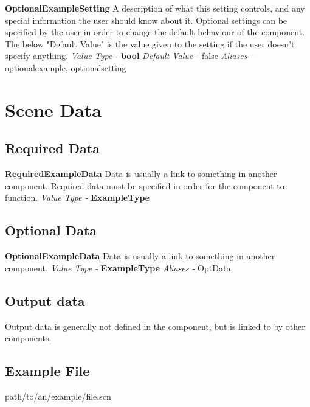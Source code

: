 \documentclass[a4paper,11pt]{article}
\newenvironment{componentoption}[1]%
{\textbf{#1}\newline}
{\newline}
\newcommand{\aliases}[1] {\newline \textit{Aliases - } #1}
\newcommand{\defaultvalue}[1] {\newline \textit{Default Value - } #1}
\newcommand{\valuetype}[1] {\newline \textit{Value Type - } \textbf{#1}}
\begin{document}
\begin{componentoption}{OptionalExampleSetting}
A description of what this setting controls, and any special information the user should know about it. Optional settings can be specified by the user in order to change the default behaviour of the component. The below "Default Value" is the value given to the setting if the user doesn't specify anything.
\valuetype{bool}
\defaultvalue{false}
\aliases{optionalexample, optionalsetting}
\end{componentoption}

\section{Scene Data}

\subsection{Required Data}

\begin{componentoption}{RequiredExampleData}
Data is usually a link to something in another component. Required data must be specified in order for the component to function.
\valuetype{ExampleType}
\end{componentoption}

\subsection{Optional Data}

\begin{componentoption}{OptionalExampleData}
Data is usually a link to something in another component.
\valuetype{ExampleType}
\aliases{OptData}
\end{componentoption}

\subsection{Output data}
Output data is generally not defined in the component, but is linked to by other components.

\subsection{Example File}
path/to/an/example/file.scn
\end{document}
